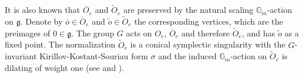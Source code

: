\documentclass[12pt]{amsart}
\theoremstyle{definition}
\newcommand{\bG}{\mathbb{G}}
\newcommand{\fg}{\mathfrak g}
\numberwithin{equation}{section}
\begin{document}
It is also known that $\overline{O}_e$ and $\widetilde{O}_e$ are preserved by the natural scaling $\bG_m$-action on $\fg$. Denote by $\overline{o}\in \overline{O}_e$ and $\tilde{o}\in \widetilde{O}_e $ the corresponding vertices, which are the preimages of $0\in \fg$. The group $G$ acts on $O_e$, $\overline{O}_e$ and therefore $\widetilde{O}_e$, and has $\tilde{o}$ as a fixed point. The normalization $\widetilde{O}_e$ is a conical symplectic singularity with the $G$-invariant Kirillov-Kostant-Souriau form $\sigma$ and the induced $\bG_m$-action on $\widetilde{O}_e $ is dilating of weight one (see \cite{Pan-nil-orbit-symp} and \cite[Section 1]{BK-nilpotent}). %
\end{document}

